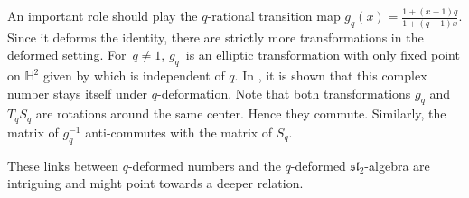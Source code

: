 \documentclass[10pt,a4paper]{amsart}
\numberwithin{equation}{section}
\renewcommand*{\H}{\mathbb{H}}
\begin{document}
An important role should play the $q$-rational transition map $g_q(x)=\frac{1+(x-1)q}{1+(q-1)x}$. Since it deforms the identity, there are strictly more transformations in the deformed setting.
For~${q\neq 1}$, $g_q$~is an elliptic transformation with only fixed point on $\H^2$ given by  which is independent of $q$. In \cite[Part~2.3]{ovsienko2021towards}, it is shown that this complex number stays itself under $q$-deformation.
Note that both transformations $g_q$ and $T_qS_q$ are rotations around the same center. Hence they commute. Similarly, the matrix of $g_q^{-1}$ anti-commutes with the matrix of $S_q$.

These links between $q$-deformed numbers and the $q$-deformed $\mathfrak{sl}_2$-algebra are intriguing and might point towards a deeper relation.
\end{document}
